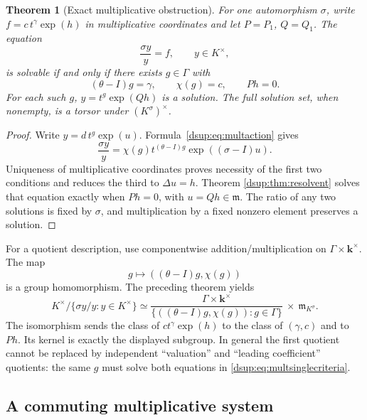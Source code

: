 \documentclass[11pt,oneside]{article}
\numberwithin{equation}{section}
\newtheorem{theorem}{Theorem}[section]
\theoremstyle{definition}
\theoremstyle{remark}
\newcommand{\kk}{\mathbf k}
\newcommand{\mm}{\mathfrak m}
\begin{document}
\begin{theorem}[Exact multiplicative obstruction]\label{dsup:thm:multsingle}
For one automorphism $\sigma$, write
$f=c\,t^\gamma\exp(h)$ in multiplicative coordinates and let $P=P_1$,
$Q=Q_1$. The equation
\begin{equation}\label{dsup:eq:multsingle}
 \frac{\sigma y}{y}=f,\qquad y\in K^\times,
\end{equation}
is solvable if and only if there exists $g\in\Gamma$ with
\begin{equation}\label{dsup:eq:multsinglecriteria}
 (\theta-I)g=\gamma,\qquad \chi(g)=c,
 \qquad Ph=0.
\end{equation}
For each such $g$, $y=t^g\exp(Qh)$ is a solution. The full solution set,
when nonempty, is a torsor under $(K^\sigma)^\times$.
\end{theorem}
\begin{proof}
Write $y=d\,t^g\exp(u)$. Formula~\eqref{dsup:eq:multaction} gives
\begin{equation}\label{dsup:eq:multquotient}
 \frac{\sigma y}{y}
 =\chi(g)t^{(\theta-I)g}\exp((\sigma-I)u).
\end{equation}
Uniqueness of multiplicative coordinates proves necessity of the first
two conditions and reduces the third to $\Delta u=h$. Theorem
\ref{dsup:thm:resolvent} solves that equation exactly when $Ph=0$, with
$u=Qh\in\mm$. The ratio of any two solutions is fixed by $\sigma$, and
multiplication by a fixed nonzero element preserves a solution.
\end{proof}

For a quotient description, use componentwise addition/multiplication on
$\Gamma\times\kk^\times$. The map
\[
 g\longmapsto((\theta-I)g,\chi(g))
\]
is a group homomorphism. The preceding theorem yields
\begin{equation}\label{dsup:eq:multquotientgroup}
 K^\times/\{\sigma y/y:y\in K^\times\}
 \simeq
 \frac{\Gamma\times\kk^\times}
      {\{((\theta-I)g,\chi(g)):g\in\Gamma\}}
 \ \times\ \mm_{K^\sigma}.
\end{equation}
The isomorphism sends the class of $c t^\gamma\exp(h)$ to the class of
$(\gamma,c)$ and to $Ph$. Its kernel is exactly the displayed subgroup.
In general the first quotient cannot be replaced by independent
``valuation'' and ``leading coefficient'' quotients: the same $g$ must
solve both equations in \eqref{dsup:eq:multsinglecriteria}.

\subsection{A commuting multiplicative system}
\end{document}
